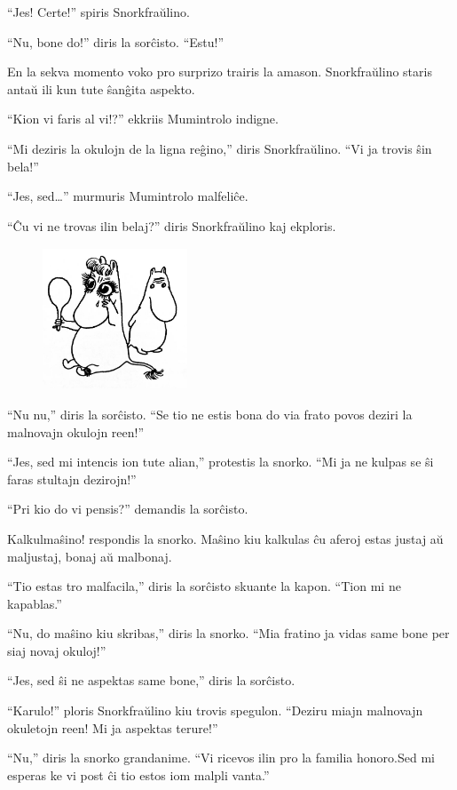 ``Jes! Certe!'' spiris Snorkfraŭlino.

``Nu, bone do!'' diris la sorĉisto. ``Estu!''

En la sekva momento voko pro surprizo trairis la amason. Snorkfraŭlino staris antaŭ ili kun tute ŝanĝita aspekto.

``Kion vi faris al vi!?'' ekkriis Mumintrolo indigne.

``Mi deziris la okulojn de la ligna reĝino,'' diris Snorkfraŭlino. ``Vi ja trovis ŝin bela!''

``Jes, sed{\ldots}'' murmuris Mumintrolo malfeliĉe.

``Ĉu vi ne trovas ilin belaj?'' diris Snorkfraŭlino kaj ekploris.

\begin{figure}[htbp]
\centering
\includegraphics[width=122pt,height=120pt]{_37.jpg}
\caption{}
\label{_37}
\end{figure}

``Nu nu,'' diris la sorĉisto. ``Se tio ne estis bona do via frato povos deziri la malnovajn okulojn reen!''

``Jes, sed mi intencis ion tute alian,'' protestis la snorko. ``Mi ja ne kulpas se ŝi faras stultajn dezirojn!''

``Pri kio do vi pensis?'' demandis la sorĉisto.

Kalkulmaŝino! respondis la snorko. Maŝino kiu kalkulas ĉu aferoj estas justaj aŭ maljustaj, bonaj aŭ malbonaj.

``Tio estas tro malfacila,'' diris la sorĉisto skuante la kapon. ``Tion mi ne kapablas.''

``Nu, do maŝino kiu skribas,'' diris la snorko. ``Mia fratino ja vidas same bone per siaj novaj okuloj!''

``Jes, sed ŝi ne aspektas same bone,'' diris la sorĉisto.

``Karulo!'' ploris Snorkfraŭlino kiu trovis spegulon. ``Deziru miajn malnovajn okuletojn reen! Mi ja aspektas terure!''

``Nu,'' diris la snorko grandanime. ``Vi ricevos ilin pro la familia honoro.Sed mi esperas ke vi post ĉi tio estos iom malpli vanta.''

